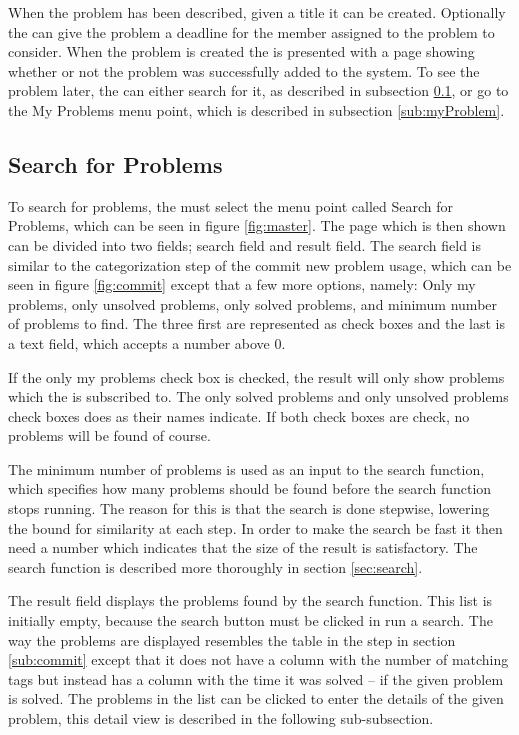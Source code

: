 When the problem has been described, given a title it can be created.
Optionally the \aclient[] can give the problem a deadline for the \astaff[] member assigned to the problem to consider.
When the problem is created the \aclient[] is presented with a page showing whether or not the problem was successfully added to the system.
To see the problem later, the \aclient[] can either search for it, as described in subsection \ref{sub:searchUsage}, or go to the My Problems menu point, which is described in subsection \ref{sub:myProblem}.

\subsection{Search for Problems}
\label{sub:searchUsage}
To search for problems, the \aclient[] must select the menu point called Search for Problems, which can be seen in figure \ref{fig:master}.
The page which is then shown can be divided into two fields; search field and result field.
The search field is similar to the categorization step of the commit new problem usage, which can be seen in figure \ref{fig:commit} except that a few more options, namely: Only my problems, only unsolved problems, only solved problems, and minimum number of problems to find.
The three first are represented as check boxes and the last is a text field, which accepts a number above 0.

If the only my problems check box is checked, the result will only show problems which the \aclient[] is subscribed to.
The only solved problems and only unsolved problems check boxes does as their names indicate.
If both check boxes are check, no problems will be found of course.

The minimum number of problems is used as an input to the search function, which specifies how many problems should be found before the search function stops running.
The reason for this is that the search is done stepwise, lowering the bound for similarity at each step.
In order to make the search be fast it then need a number which indicates that the size of the result is satisfactory.
The search function is described more thoroughly in section \ref{sec:search}.

The result field displays the problems found by the search function.
This list is initially empty, because the search button must be clicked in run a search.
The way the problems are displayed resembles the table in the  step in section \ref{sub:commit} except that it does not have a column with the number of matching tags but instead has a column with the time it was solved -- if the given problem is solved.
The problems in the list can be clicked to enter the details of the given problem, this detail view is described in the following sub-subsection.

